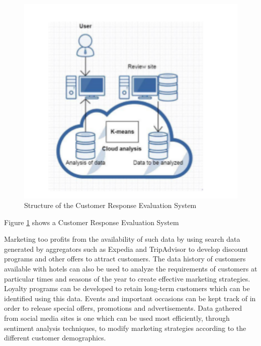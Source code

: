 \documentclass[sigconf]{acmart}
\begin{document}
\begin{figure}
	\includegraphics[width=\columnwidth]{images/evaluation_system.pdf}
	\caption{Structure of the Customer Response Evaluation System \cite {jianfangwang07}}
        \label{F:Figure 2}
\end{figure}
Figure \ref{F:Figure 2} shows a Customer Response Evaluation System

Marketing too profits from the availability of such data by using search data generated by aggregators such as Expedia and TripAdvisor to develop discount programs and other offers to attract customers. The data history of customers available with hotels can also be used to analyze the requirements of customers at particular times and seasons of the year to create effective marketing strategies. Loyalty programs can be developed to retain long-term customers which can be identified using this data. Events and important occasions can be kept track of in order to release special offers, promotions and advertisements. Data gathered from social media sites is one which can be used most efficiently, through sentiment analysis techniques, to modify marketing strategies according to the different customer demographics.
\end{document}
